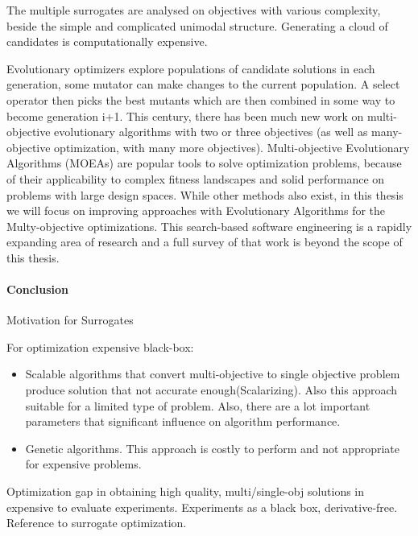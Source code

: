                 The multiple surrogates are analysed on objectives with various complexity, beside the simple and complicated unimodal structure. Generating a cloud of candidates is computationally expensive.

                Evolutionary optimizers explore populations of candidate solutions in each generation, some mutator can make changes to the current population. A select operator then picks the best mutants which are then combined in some way to become generation i+1. 
                This century, there has been much new work on multi-objective evolutionary algorithms with two or three objectives 
                (as well as many-objective optimization, with many more objectives). Multi-objective Evolutionary Algorithms (MOEAs) are popular tools to solve optimization problems, because of their applicability to complex fitness landscapes and solid performance on problems with large design spaces. While other methods also exist, in this thesis we will focus on improving approaches with Evolutionary Algorithms for the Multy-objective optimizations.
                This search-based software engineering is a rapidly expanding area of research and a full survey of that work is 
                beyond the scope of this thesis.

        \paragraph{Conclusion}
            Motivation for Surrogates

            For optimization expensive black-box:
            \begin{itemize}
                \item Scalable algorithms that convert multi-objective to single objective problem produce solution that not accurate enough(Scalarizing). Also this approach suitable for a limited type of problem. Also, there are a lot important parameters that significant influence on algorithm performance.
                \item Genetic algorithms. This approach is costly to perform and not appropriate for expensive problems.
            \end{itemize}
            Optimization gap in obtaining high quality, multi/single-obj solutions in expensive to evaluate experiments.
            Experiments as a black box, derivative-free. Reference to surrogate optimization.


